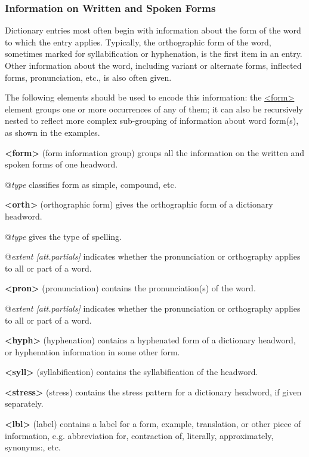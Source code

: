 \subsubsection[{Information on Written and Spoken Forms}]{Information on Written and Spoken Forms}\label{DITPFO}\par
Dictionary entries most often begin with information about the form of the word to which the entry applies. Typically, the orthographic form of the word, sometimes marked for syllabification or hyphenation, is the first item in an entry. Other information about the word, including variant or alternate forms, inflected forms, pronunciation, etc., is also often given. \par
The following elements should be used to encode this information: the \hyperref[TEI.form]{<form>} element groups one or more occurrences of any of them; it can also be recursively nested to reflect more complex sub-grouping of information about word form(s), as shown in the examples.
\begin{sansreflist}
  
\item [\textbf{<form>}] (form information group) groups all the information on the written and spoken forms of one headword.\hfil\\[-10pt]\begin{sansreflist}
    \item[@{\itshape type}]
  classifies form as simple, compound, etc.
\end{sansreflist}  
\item [\textbf{<orth>}] (orthographic form) gives the orthographic form of a dictionary headword.\hfil\\[-10pt]\begin{sansreflist}
    \item[@{\itshape type}]
  gives the type of spelling.
    \item[@{\itshape extent [att.partials]}]
  indicates whether the pronunciation or orthography applies to all or part of a word.
\end{sansreflist}  
\item [\textbf{<pron>}] (pronunciation) contains the pronunciation(s) of the word.\hfil\\[-10pt]\begin{sansreflist}
    \item[@{\itshape extent [att.partials]}]
  indicates whether the pronunciation or orthography applies to all or part of a word.
\end{sansreflist}  
\item [\textbf{<hyph>}] (hyphenation) contains a hyphenated form of a dictionary headword, or hyphenation information in some other form.
\item [\textbf{<syll>}] (syllabification) contains the syllabification of the headword.
\item [\textbf{<stress>}] (stress) contains the stress pattern for a dictionary headword, if given separately.
\item [\textbf{<lbl>}] (label) contains a label for a form, example, translation, or other piece of information, e.g. abbreviation for, contraction of, literally, approximately, synonyms:, etc.
\end{sansreflist}
